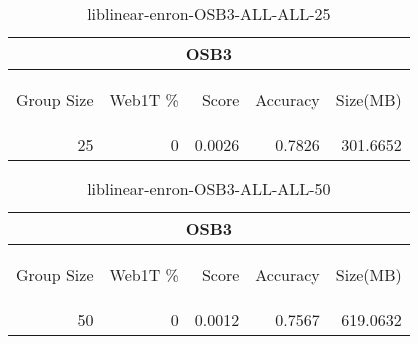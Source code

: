 \begin{center}
\begin{table}[htbp]
\begin{tabular}{ | r | r | r | r | r |}
\hline
\multicolumn{5}{|c|}{OSB3}\\
\hline
\begin{sideways}Group Size\end{sideways} & \begin{sideways}Web1T \%\end{sideways} & \begin{sideways}Score\end{sideways} & \begin{sideways}Accuracy\end{sideways} & \begin{sideways}Size(MB)\end{sideways}\\
\hline
\multirow{0}{*}{25}
 & 0 & 0.0026 & 0.7826 & 301.6652\\ \cline{2-5}
\hline
\end{tabular}
\caption{liblinear-enron-OSB3-ALL-ALL-25}
\label{table:liblinear-enron-OSB3-ALL-ALL-25}
\end{table}
\end{center}

\begin{center}
\begin{table}[htbp]
\begin{tabular}{ | r | r | r | r | r |}
\hline
\multicolumn{5}{|c|}{OSB3}\\
\hline
\begin{sideways}Group Size\end{sideways} & \begin{sideways}Web1T \%\end{sideways} & \begin{sideways}Score\end{sideways} & \begin{sideways}Accuracy\end{sideways} & \begin{sideways}Size(MB)\end{sideways}\\
\hline
\multirow{0}{*}{50}
 & 0 & 0.0012 & 0.7567 & 619.0632\\ \cline{2-5}
\hline
\end{tabular}
\caption{liblinear-enron-OSB3-ALL-ALL-50}
\label{table:liblinear-enron-OSB3-ALL-ALL-50}
\end{table}
\end{center}

